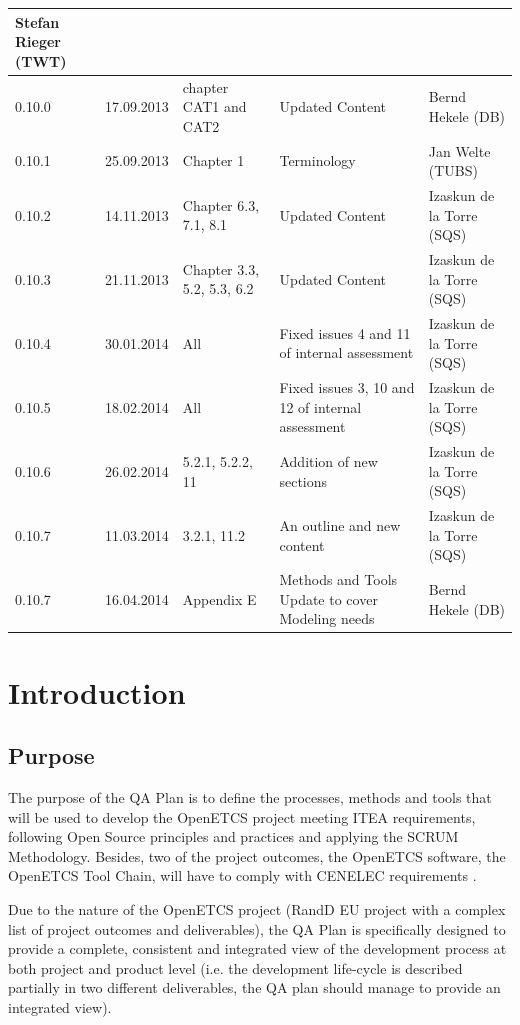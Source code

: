 \documentclass{template/openetcs_article}
\begin{document}
\begin{center}
\begin{longtable}{m{1.1cm}m{1.8cm}m{2cm}m{5cm}m{4cm}}
Stefan Rieger (TWT)\\\hline
0.10.0 &
17.09.2013 &
chapter CAT1 and CAT2 &
Updated Content  &
Bernd Hekele (DB)
\\\hline
0.10.1 &
25.09.2013 &
Chapter 1 &
Terminology &
Jan Welte (TUBS)
\\\hline
0.10.2 &
14.11.2013 &
Chapter 6.3, 7.1, 8.1 &
Updated Content &
Izaskun de la Torre (SQS)
\\\hline
0.10.3 &
21.11.2013 &
Chapter 3.3, 5.2, 5.3, 6.2 &
Updated Content &
Izaskun de la Torre (SQS)
\\\hline
0.10.4 &
30.01.2014 &
All &
Fixed issues 4 and 11 of internal assessment &
Izaskun de la Torre (SQS)
\\\hline
0.10.5 &
18.02.2014 &
All &
Fixed issues 3, 10 and 12 of internal assessment &
Izaskun de la Torre (SQS)
\\\hline
0.10.6 &
26.02.2014 &
5.2.1, 5.2.2, 11 &
Addition of new sections &
Izaskun de la Torre (SQS)
\\\hline
0.10.7 &
11.03.2014 &
3.2.1, 11.2 &
An outline and new content &
Izaskun de la Torre (SQS)
\\\hline
0.10.7 &
16.04.2014 &
Appendix E &
Methods and Tools Update to cover Modeling needs &
Bernd Hekele (DB)
\end{longtable}
\end{center}


\newpage



\section[Introduction]{Introduction}


\subsection{Purpose}

The purpose of the QA Plan is to define the processes, methods and tools that will be used to develop the OpenETCS project meeting ITEA requirements, following Open Source principles and practices and applying the SCRUM Methodology. Besides, two of the project outcomes, the OpenETCS software, the OpenETCS Tool Chain, will have to comply with CENELEC requirements \citep{EN50128}.

Due to the nature of the OpenETCS project (\gls{RandD} EU project with a complex list of project outcomes and deliverables), the QA Plan is specifically designed to provide a complete, consistent and integrated view of the development process at both project and product level (i.e. the development life-cycle is described partially in two different deliverables, the QA plan should manage to provide an integrated view).
\end{document}
